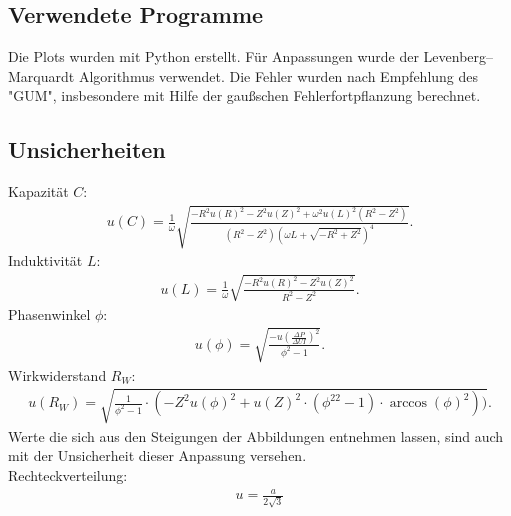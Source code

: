 


\subsection{Verwendete Programme}
Die Plots wurden mit Python erstellt. Für Anpassungen wurde der  Levenberg–Marquardt Algorithmus verwendet. Die Fehler wurden nach Empfehlung des "GUM", insbesondere mit Hilfe der gaußschen Fehlerfortpflanzung berechnet.


\subsection{Unsicherheiten}\label{kap:Unsich}
Kapazität $C$:
\begin{align*}
	u(C)=\frac{1}{\omega} \sqrt{\frac{- R^{2} u(R)^{2} - Z^{2} u(Z)^{2} + \omega^2 u(L)^{2} \left(R^{2} - Z^{2}\right)}{\left(R^{2} - Z^{2}\right) \left(\omega L + \sqrt{- R^{2} + Z^{2}}\right)^{4}}}	.
\end{align*}
Induktivität $L$:
\begin{align*}
	u(L)=\frac{1}{\omega} \sqrt{\frac{- R^{2} u(R)^{2} - Z^{2} u(Z)^{2}}{R^{2} - Z^{2}}}.
\end{align*}
Phasenwinkel $\phi$: 
\begin{align*}
	u(\phi)=\sqrt{\frac{-u\left(\frac{\Delta P}{\Delta UI}\right)^2}{\phi^2-1}}.
\end{align*}
Wirkwiderstand $R_W$:
\begin{align*}
	u(R_W)=\sqrt{\frac{1}{\phi^2-1}\cdot(-Z^2u(\phi)^2+u(Z)^2\cdot(\phi^22-1)\cdot \arccos(\phi)^2))}.
\end{align*}
Werte die sich aus  den Steigungen der Abbildungen entnehmen lassen, sind auch mit der Unsicherheit dieser Anpassung versehen.\\
Rechteckverteilung:
\begin{align}
	u=\frac{a}{2\sqrt{3}}\label{eq:sur}
\end{align}

